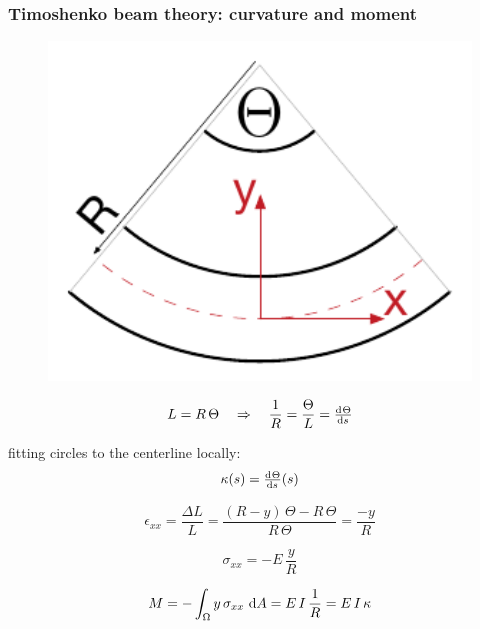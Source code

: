 \begin{frame}
  \frametitle{Timoshenko beam theory: curvature and moment}

  \begin{multicols}{2}
    \noindent
    \begin{figure}
    \centering
      \includegraphics[width=13cm, keepaspectratio=true]{sections/traditional_beams/images/TimoshenkoBeam2}
    \end{figure}
    
    \begin{displaymath}
      L = R \, \Theta \quad \Rightarrow \quad \frac{1}{R} = \frac{\Theta}{L} = \od{\Theta}{s}
    \end{displaymath}
    
    \vspace{0.5em}
    fitting circles to the centerline locally:
    \begin{displaymath}
      \kappa(s) = \od{\Theta}{s}(s)
    \end{displaymath}
    
    \begin{displaymath}
      \epsilon_{xx} = \frac{\Delta L}{L} = \frac{(R-y) \, \Theta - R \, \Theta}{R \, \Theta} = \frac{-y}{R}
    \end{displaymath}
    
    \begin{displaymath}
      \sigma_{xx} = -E \, \frac{y}{R}
    \end{displaymath}
    
    \begin{displaymath}
      M = - \int_{\Omega} y \, \sigma_{xx} \, \dif A = E \, I \, \frac{1}{R} = E \, I \, \kappa
    \end{displaymath}
  \end{multicols}

\end{frame}


